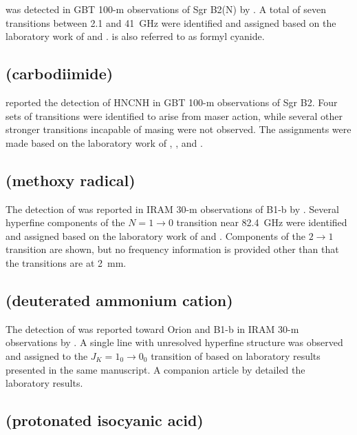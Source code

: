 \documentclass[twocolumn]{aastex631}
\begin{document}
	 was detected in GBT 100-m observations of Sgr B2(N) by \citet{Remijan:2008wn}.  A total of seven transitions between 2.1 and 41~GHz were identified and assigned based on the laboratory work of \citet{Bogey:1988bv} and \citet{Bogey:1995ci}.   is also referred to as formyl cyanide.
	
	\subsection{ (carbodiimide)}
	\label{HNCNH}
	
	\citet{McGuire:2012jf} reported the detection of HNCNH in GBT 100-m observations of Sgr B2.  Four sets of transitions were identified to arise from maser action, while several other stronger transitions incapable of masing were not observed.  The assignments were made based on the laboratory work of \citet{Birk:1980yr}, \citet{Wagener:1995wu}, and \citet{Jabs:1997tr}.
	
	\subsection{ (methoxy radical)}
	\label{CH3O}
	
	The detection of  was reported in IRAM 30-m observations of B1-b by \citet{Cernicharo:2012eq}. Several hyperfine components of the $N = 1\rightarrow0$ transition near 82.4~GHz were identified and assigned based on the laboratory work of \citet{Endo:1984ej} and \citet{Momose:1988bu}.  Components of the $2\rightarrow1$ transition are shown, but no frequency information is provided other than that the transitions are at 2~mm.
	
	\subsection{ (deuterated ammonium cation)}
	\label{NH3D+}
	
	The detection of  was reported toward Orion and B1-b in IRAM 30-m observations by \citet{Cernicharo:2013uw}.  A single line with unresolved hyperfine structure was observed and assigned to the $J_K = 1_0\rightarrow0_0$ transition of  based on laboratory results presented in the same manuscript.  A companion article by \citet{Domenech:2013kl} detailed the laboratory results.
	
	\subsection{ (protonated isocyanic acid)}
	\label{H2NCO+}
	
\end{document}

